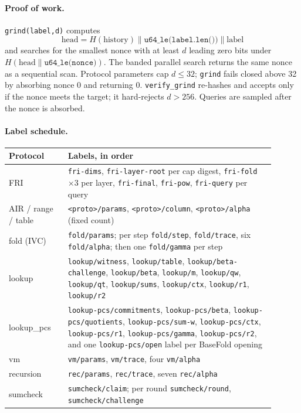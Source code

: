 \documentclass[11pt,a4paper]{article}
\begin{document}
\paragraph{Proof of work.} \texttt{grind(label,d)} computes
\[
\mathrm{head}=H(\mathrm{history})\|\texttt{u64\_le(label.len())}\|\mathrm{label}
\]
and searches for the smallest nonce with at least $d$ leading zero bits under
$H(\mathrm{head}\|\texttt{u64\_le(nonce)})$. The banded parallel search
returns the same nonce as a sequential scan. Protocol parameters cap $d\le32$;
\texttt{grind} fails closed above 32 by absorbing nonce $0$ and returning
$0$. \texttt{verify\_grind} re-hashes and accepts only if the nonce meets the
target; it hard-rejects $d>256$. Queries are sampled after the nonce is
absorbed.

\paragraph{Label schedule.}
\begin{longtable}{@{}L{0.20\linewidth}L{0.70\linewidth}@{}}
\toprule
Protocol & Labels, in order \\
\midrule
\endhead
FRI & \texttt{fri-dims}, \texttt{fri-layer-root} per cap digest,
\texttt{fri-fold} $\times3$ per layer, \texttt{fri-final},
\texttt{fri-pow}, \texttt{fri-query} per query \\
AIR / range / table & \texttt{<proto>/params}, \texttt{<proto>/column},
\texttt{<proto>/alpha} (fixed count) \\
fold (IVC) & \texttt{fold/params}; per step \texttt{fold/step},
\texttt{fold/trace}, six \texttt{fold/alpha}; then one \texttt{fold/gamma}
per step \\
lookup & \texttt{lookup/witness}, \texttt{lookup/table},
\texttt{lookup/beta-challenge}, \texttt{lookup/beta}, \texttt{lookup/m},
\texttt{lookup/qw}, \texttt{lookup/qt}, \texttt{lookup/sums},
\texttt{lookup/ctx}, \texttt{lookup/r1}, \texttt{lookup/r2} \\
lookup\_pcs & \texttt{lookup-pcs/commitments}, \texttt{lookup-pcs/beta},
\texttt{lookup-pcs/quotients}, \texttt{lookup-pcs/sum-w},
\texttt{lookup-pcs/ctx}, \texttt{lookup-pcs/r1},
\texttt{lookup-pcs/gamma}, \texttt{lookup-pcs/r2}, and one
\texttt{lookup-pcs/open} label per BaseFold opening \\
vm & \texttt{vm/params}, \texttt{vm/trace}, four \texttt{vm/alpha} \\
recursion & \texttt{rec/params}, \texttt{rec/trace}, seven \texttt{rec/alpha} \\
sumcheck & \texttt{sumcheck/claim}; per round \texttt{sumcheck/round},
\texttt{sumcheck/challenge} \\
\bottomrule
\end{longtable}
\end{document}
